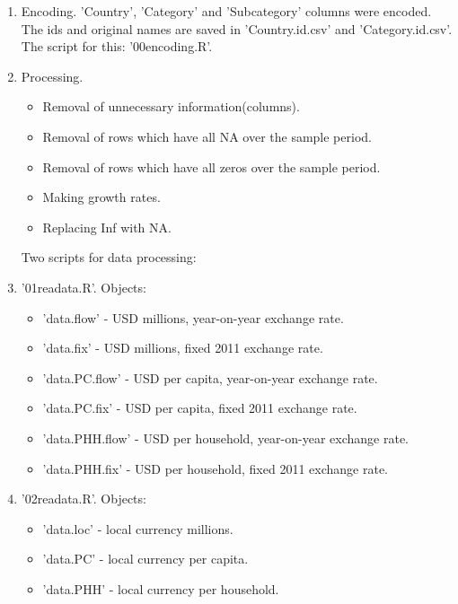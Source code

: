 \documentclass[a4paper]{article}
\begin{document}
\begin{enumerate}
\item Encoding. 'Country', 'Category' and 'Subcategory' columns were
  encoded. The ids and original names are saved in 'Country.id.csv'
  and 'Category.id.csv'. The script for this: '00encoding.R'.

\item Processing.
  \begin{itemize}
    \item Removal of unnecessary information(columns).
    \item Removal of rows which have all NA over the sample period.
    \item Removal of rows which have all zeros over the sample period.
    \item Making growth rates.
    \item Replacing Inf with NA.
  \end{itemize}

  Two scripts for data processing:

\item '01readata.R'. Objects:
  \begin{itemize}
    \item 'data.flow' - USD millions, year-on-year exchange rate.
    \item 'data.fix' - USD millions, fixed 2011 exchange rate.
    \item 'data.PC.flow' - USD per capita, year-on-year exchange rate.
    \item 'data.PC.fix' - USD per capita, fixed 2011 exchange rate.
    \item 'data.PHH.flow' - USD per household, year-on-year exchange rate.
    \item 'data.PHH.fix' - USD per household, fixed 2011 exchange rate.
  \end{itemize}

\item '02readata.R'. Objects:
  \begin{itemize}
    \item 'data.loc' - local currency millions.
    \item 'data.PC' - local currency per capita.
    \item 'data.PHH' - local currency per household.
  \end{itemize}
\end{enumerate}
\end{document}
